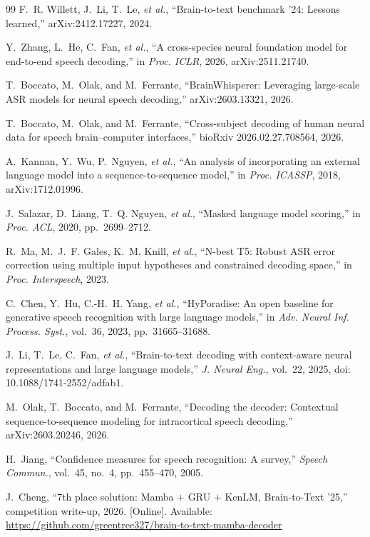 \documentclass[conference,a4paper,10pt]{IEEEtran}
\begin{document}
\begin{thebibliography}{99}
F.~R. Willett, J.~Li, T.~Le, \textit{et al.}, ``Brain-to-text benchmark '24: Lessons learned,'' arXiv:2412.17227, 2024.

Y.~Zhang, L.~He, C.~Fan, \textit{et al.}, ``A cross-species neural foundation model for end-to-end speech decoding,'' in \textit{Proc. ICLR}, 2026, arXiv:2511.21740.

T.~Boccato, M.~Olak, and M.~Ferrante, ``BrainWhisperer: Leveraging large-scale ASR models for neural speech decoding,'' arXiv:2603.13321, 2026.

T.~Boccato, M.~Olak, and M.~Ferrante, ``Cross-subject decoding of human neural data for speech brain--computer interfaces,'' bioRxiv 2026.02.27.708564, 2026.

A.~Kannan, Y.~Wu, P.~Nguyen, \textit{et al.}, ``An analysis of incorporating an external language model into a sequence-to-sequence model,'' in \textit{Proc. ICASSP}, 2018, arXiv:1712.01996.

J.~Salazar, D.~Liang, T.~Q. Nguyen, \textit{et al.}, ``Masked language model scoring,'' in \textit{Proc. ACL}, 2020, pp.~2699--2712.

R.~Ma, M.~J.~F. Gales, K.~M. Knill, \textit{et al.}, ``N-best T5: Robust ASR error correction using multiple input hypotheses and constrained decoding space,'' in \textit{Proc. Interspeech}, 2023.

C.~Chen, Y.~Hu, C.-H.~H. Yang, \textit{et al.}, ``HyPoradise: An open baseline for generative speech recognition with large language models,'' in \textit{Adv. Neural Inf. Process. Syst.}, vol.~36, 2023, pp.~31665--31688.

J.~Li, T.~Le, C.~Fan, \textit{et al.}, ``Brain-to-text decoding with context-aware neural representations and large language models,'' \textit{J. Neural Eng.}, vol.~22, 2025, doi:\,10.1088/1741-2552/adfab1.

M.~Olak, T.~Boccato, and M.~Ferrante, ``Decoding the decoder: Contextual sequence-to-sequence modeling for intracortical speech decoding,'' arXiv:2603.20246, 2026.

H.~Jiang, ``Confidence measures for speech recognition: A survey,'' \textit{Speech Commun.}, vol.~45, no.~4, pp.~455--470, 2005.

J.~Cheng, ``7th place solution: Mamba $+$ GRU $+$ KenLM, Brain-to-Text '25,'' competition write-up, 2026. [Online]. Available: \url{https://github.com/greentree327/brain-to-text-mamba-decoder}


\end{thebibliography}
\end{document}
